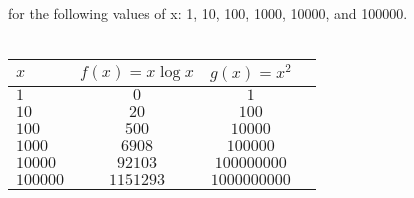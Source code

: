\documentclass[11pt]{article}
\begin{document}
\begin{enumerate}
\begin{enumerate}
for the following values of x: 1, 10, 100, 1000, 10000, and 100000.
\\
\\
\begin{center}
\begin{tabular}{|l|c|c|r|}
\hline
\textbf{$x$} & \textbf{$f(x)=x \log x$} & \textbf{$g(x)=x^2$}  \\
\hline
$1$          & $0$          & $1$       \\
$10$        & $20$        & $100$        \\
$100$ 		&$500$&$10000$\\
$1000$&$6908$&$100000$\\
$10000$&$92103$&$100000000$\\
$100000$&$1151293$&$1000000000$\\
\hline

\end{tabular}
\end{center}
\end{enumerate}

\end{enumerate}
\end{document}

